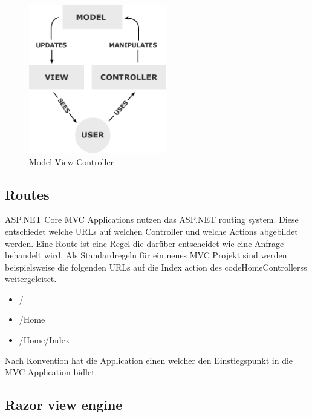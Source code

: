 \begin{figure}
\centering
\includegraphics[width=6cm]{Figures/mvc}
\caption{Model-View-Controller}
\label{fig:mvc}
\end{figure}


\subsection{Routes}

ASP.NET Core MVC Applications nutzen das ASP.NET routing system. Diese entschiedet welche URLs auf welchen Controller und welche Actions abgebildet werden. Eine Route ist eine Regel die darüber entscheidet wie eine Anfrage behandelt wird. Als Standardregeln für ein neues MVC Projekt sind werden beispielsweise die folgenden URLs auf die Index action des code{HomeControllers}s weitergeleitet.

\begin{itemize}

	\item /
	\item /Home
	\item /Home/Index

\end{itemize}

\noindent
Nach Konvention hat die Application einen  welcher den Einstiegspunkt in die MVC Application bidlet.

\subsection{Razor view engine}
